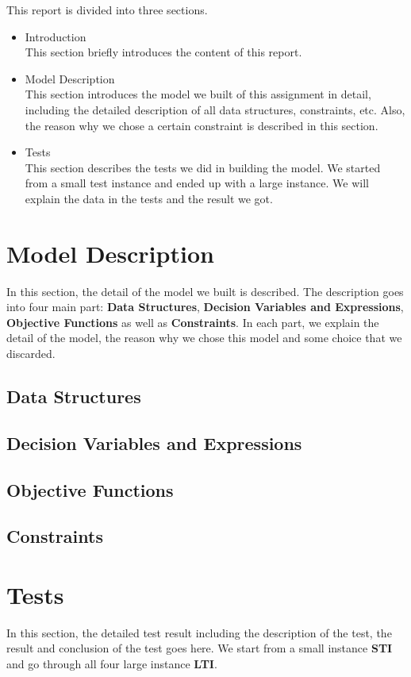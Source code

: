 \documentclass[a4paper, 12pt]{article}
\newcommand{\twoline}{\vspace{2ex}}
\begin{document}
This report is divided into three sections. 
\begin{itemize}
	\item Introduction \\
		This section briefly introduces the content of this report. 
	\item Model Description \\
		This section introduces the model we built of this assignment in detail, including the detailed description of all data structures, constraints, etc. Also, the reason why we chose a certain constraint is described in this section. 
	\item Tests \\
		This section describes the tests we did in building the model. We started from a small test instance and ended up with a large instance. We will explain the data in the tests and the result we got. 
\end{itemize}

\newpage

\section{Model Description}

In this section, the detail of the model we built is described. The description goes into four main part: \textbf{Data Structures}, \textbf{Decision Variables and Expressions}, \textbf{Objective Functions} as well as \textbf{Constraints}. In each part, we explain the detail of the model, the reason why we chose this model and some choice that we discarded. 

\subsection{Data Structures}
\twoline

\subsection{Decision Variables and Expressions}
\twoline 

\subsection{Objective Functions}
\twoline 

\subsection{Constraints}



\newpage

\section{Tests}

In this section, the detailed test result including the description of the test, the result and conclusion of the test goes here. We start from a small instance \textbf{STI} and go through all four large instance \textbf{LTI}. 
\end{document}
